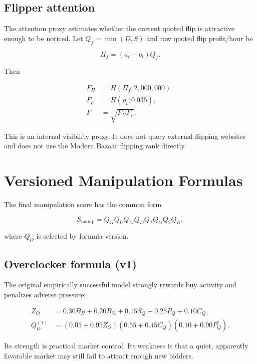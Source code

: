 \documentclass[11pt,a4paper]{article}
\begin{document}
\subsection{Flipper attention}

The attention proxy estimates whether the current quoted flip is attractive enough to be
noticed. Let $Q_f=\min(D,S)$ and raw quoted flip profit/hour be

\begin{equation}
\Pi_f=(a_t-b_t)Q_f.
\end{equation}

Then

\begin{align}
F_\Pi&=H(\Pi_f;2{,}000{,}000),\\
F_\rho&=H(\rho_t;0.035),\\
F&=\sqrt{F_\Pi F_\rho}.
\end{align}

This is an internal visibility proxy. It does not query external flipping websites and does
not use the Modern Bazaar flipping rank directly.

\section{Versioned Manipulation Formulas}

The final manipulation score has the common form

\begin{equation}
\boxed{S_{\mathrm{manip}}=
Q_\Pi Q_U Q_M Q_D Q_T Q_O Q_2 Q_R,}
\end{equation}

where $Q_O$ is selected by formula version.

\subsection{Overclocker formula (v1)}

The original empirically successful model strongly rewards buy activity and penalizes
adverse pressure:

\begin{align}
Z_O&=0.30B_H+0.20B_\%+0.15S_Q+0.25P_Q+0.10C_Q,\\
Q_O^{(1)}&=(0.05+0.95Z_O)(0.55+0.45C_Q)(0.10+0.90P_Q^*).
\end{align}

Its strength is practical market control. Its weakness is that a quiet, apparently favorable
market may still fail to attract enough new bidders.
\end{document}
